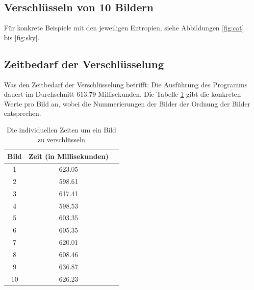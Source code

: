 \subsection{Verschlüsseln von 10 Bildern}
Für konkrete Beispiele mit den jeweiligen Entropien, siehe Abbildungen \ref{fig:cat} bis \ref{fig:sky}.

\subsection{Zeitbedarf der Verschlüsselung}
Was den Zeitbedarf der Verschlüsselung betrifft: Die Ausführung des Programms dauert im Durchschnitt
$613.79$ Millisekunden.
Die Tabelle \ref{tab:speed3} gibt die konkreten Werte pro Bild an, wobei die Nummerierungen der Bilder
der Ordnung der Bilder entsprechen.
\begin{table}
	\begin{center}
		\begin{tabular}{ |c|c|c| } 
		\hline
		Bild & Zeit (in Millisekunden) \\
		\hline
		1 & 623.05 \\
		2 & 598.61 \\
		3 & 617.41\\
		4 & 598.53\\
		5 & 603.35\\
		6 & 605.35\\
		7 & 620.01\\
		8 & 608.46\\
		9 & 636.87\\
		10 & 626.23\\
		\hline
		\end{tabular}
	\end{center}
	\caption{Die individuellen Zeiten um ein Bild zu verschlüsseln}
	\label{tab:speed3}
\end{table}

